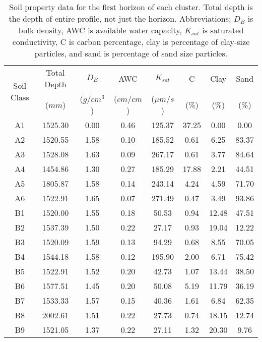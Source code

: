 \begin{table}[h!]
	\caption[Soil property data for the first horizon of each cluster.]{Soil property data for the first horizon of each cluster. Total depth is the depth of entire profile, not just the horizon. Abbreviations: $D_B$ is bulk density, AWC is available water capacity, $K_{sat}$ is saturated conductivity, C is carbon percentage, clay is percentage of clay-size particles, and sand is percentage of sand size particles.}
	\centering
		\begin{tabular}{c c c c c c c c}
			\hline
			\multirow{2}{*}{Soil Class}	 & 	Total Depth	 & 	$D_B$	 & 	AWC	 & 	$K_{sat}$	 & 	C	 & 	Clay	 & 	Sand \\		 	 			& 	($mm$)	 	& ($g/cm^3$)& ($cm/cm$)& 	($\mu m/s$)	 & 	(\%)	 & 	(\%)	 & 	(\%) \\[0.5ex]
			\hline \hline 
			A1	 & 	1525.30	 & 	0.00	 & 	0.46	 & 	125.37	 & 	37.25	 & 	0.00	 & 	0.00  \\
			A2	 & 	1520.55	 & 	1.58	 & 	0.10	 & 	185.52	 & 	0.61	 & 	6.25	 & 	83.37 \\
			A3	 & 	1528.08	 & 	1.63	 & 	0.09	 & 	267.17	 & 	0.61	 & 	3.77	 & 	84.64 \\
			A4	 & 	1454.86	 & 	1.30	 & 	0.27	 & 	185.29	 & 	17.88	 & 	2.21	 & 	44.51 \\
			A5	 & 	1805.87	 & 	1.58	 & 	0.14	 & 	243.14	 & 	4.24	 & 	4.59	 & 	71.70 \\
			A6	 & 	1522.91	 & 	1.65	 & 	0.07	 & 	271.49	 & 	0.47	 & 	3.49	 & 	93.86 \\
			B1	 & 	1520.00	 & 	1.55	 & 	0.18	 & 	50.53	 & 	0.94	 & 	12.48	 & 	47.51 \\
			B2	 & 	1537.39	 & 	1.50	 & 	0.22	 & 	27.17	 & 	0.93	 & 	19.04	 & 	12.22 \\
			B3	 & 	1520.09	 & 	1.59	 & 	0.13	 & 	94.29	 & 	0.68	 & 	8.55	 & 	70.05 \\
			B4	 & 	1544.18	 & 	1.58	 & 	0.12	 & 	195.90	 & 	2.00	 & 	6.71	 & 	75.42 \\
			B5	 & 	1522.91	 & 	1.52	 & 	0.20	 & 	42.73	 & 	1.07	 & 	13.44	 & 	38.50 \\
			B6	 & 	1577.51	 & 	1.45	 & 	0.20	 & 	50.08	 & 	5.19	 & 	11.79	 & 	36.19 \\
			B7	 & 	1533.33	 & 	1.57	 & 	0.15	 & 	40.36	 & 	1.61	 & 	6.84	 & 	62.35 \\
			B8	 & 	2002.61	 & 	1.51	 & 	0.22	 & 	27.73	 & 	0.74	 & 	18.15	 & 	12.74 \\
			B9	 & 	1521.05	 & 	1.37	 & 	0.22	 & 	27.11	 & 	1.32	 & 	20.30	 & 	9.76 \\

\end{tabular}
\end{table}

